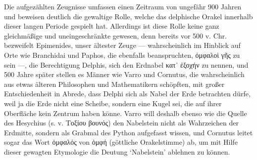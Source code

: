 \documentclass[a4paper, 11pt, oneside]{article}
\begin{document}
Die aufgezählten Zeugnisse umfassen einen Zeitraum von ungefähr 900 Jahren und beweisen deutlich die gewaltige Rolle, welche das delphische Orakel innerhalb dieser langen Periode gespielt hat. Allerdings ist diese Rolle keine ganz gleichmäßige und uneingeschränkte gewesen, denn bereits vor 500 v. Chr. bezweifelt Epimenides, unser ältester Zeuge --- wahrscheinlich im Hinblick auf Orte wie Branchidai und Paphos, die ebenfalls beanspruchten, ὀμφαλοὶ γῆς zu sein ---, die Berechtigung Delphis, sich den Erdnabel κατ᾽ ἐξοχήν zu nennen, und 500 Jahre später stellen es Männer wie Varro und Cornutus, die wahrscheinlich aus etwas älteren Philosophen und Mathematikern schöpften, mit großer Entschiedenheit in Abrede, dass Delphi sich als Nabel der Erde betrachten dürfe, weil ja die Erde nicht eine Scheibe, sondern eine Kugel sei, die auf ihrer Oberfläche kein Zentrum haben könne. Varro will deshalb ebenso wie die Quelle des Hesychius (s. v. Τοξίου βουνός) den Nabelstein nicht als Wahrzeichen der Erdmitte, sondern als Grabmal des Python aufgefasst wissen, und Cornutus leitet sogar das Wort ὀμφαλός von ὀμφή (göttliche Orakelstimme) ab, um mit Hilfe dieser gewagten Etymologie die Deutung `Nabelstein' ablehnen zu können.
\end{document}
